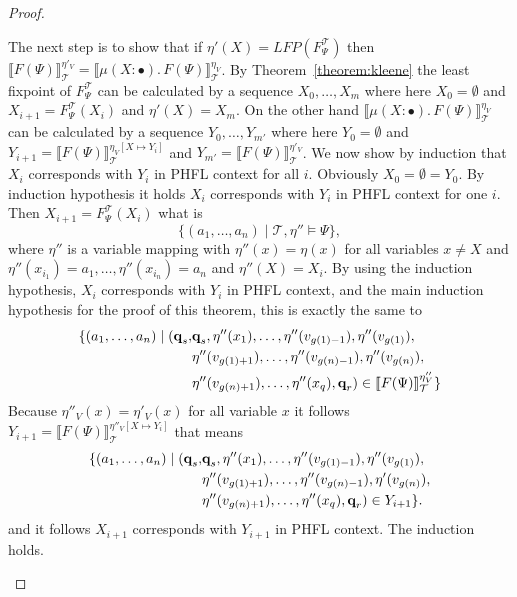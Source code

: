\begin{proof}
\begin{compactitem}
        The next step is to show that if $\eta'(X) = LFP(F^\mathcal{T}_\Psi)$ then $\llbracket F(\Psi) \rrbracket^{\eta'_V}_\mathcal{T} = \llbracket \mu (X \colon \bullet).\,F(\Psi)\rrbracket_\mathcal{T}^{\eta_V}$. By 
        Theorem~\ref{theorem:kleene} the least fixpoint of $F^\mathcal{T}_\Psi$ can be calculated by a sequence $X_0, \dots, X_m$ where here $X_0 = \emptyset$ and $X_{i+1} 
        = F_\Psi^\mathcal{T}(X_i)$ and $\eta'(X) = X_m$. On the other hand $\llbracket \mu (X \colon \bullet).\,F(\Psi)\rrbracket_\mathcal{T}^{\eta_V}$ can be calculated by a sequence 
         $Y_0, \dots, Y_{m'}$ where here $Y_0 = \emptyset$ and $Y_{i+1} = \llbracket F(\Psi)\rrbracket_\mathcal{T}^{\eta_V[X \mapsto Y_i]}$ and $Y_{m'} = \llbracket F(\Psi)\rrbracket_\mathcal{T}^{\eta'_V}$. We now show by induction that $X_i$ corresponds with $Y_i$ in PHFL context for all $i$. Obviously $X_0 = \emptyset = Y_0$. By induction hypothesis it holds $X_i$ corresponds with $Y_i$ in PHFL context for 
         one $i$. Then $X_{i+1} = F_\Psi^\mathcal{T}(X_i)$ what is
         \[\{(a_1, \dots, a_n) \mid \mathcal{T}, \eta'' \models \Psi\},\] 
         where $\eta''$ is a variable mapping with $\eta''(x) = \eta(x)$ for all variables $x \neq X$ and $\eta''(x_{i_1}) = a_1, \dots,  \eta''(x_{i_n}) = a_n$ and $\eta''(X) = X_i$. 
         By using the induction hypothesis, $X_i$ corresponds with $Y_i$ in PHFL context, and the main induction hypothesis for the proof of this theorem, this is exactly the same to
                 \begin{align*}
                 \{(a_1, \dots, a_n) \mid 
        (\emph{q}_s, &\emph{q}_s, \eta''(x_1), \dots, \eta''(v_{g(1)-1}), \eta''(v_{g(1)}),\\& \eta''(v_{g(1)+1}), \dots, \eta''(v_{g(n)-1}), \eta''(v_{g(n)}), \\&\eta''(v_{g(n)+1}), \dots, \eta''
            (x_q), \emph{q}_r) \in \llbracket
        F(\Psi) \rrbracket^{\eta''_V}_\mathcal{T}\}
        \end{align*}
		Because $\eta''_V(x) = \eta'_V(x)$ for all variable $x$ it follows $Y_{i+1} = \llbracket F(\Psi)\rrbracket_\mathcal{T}^{\eta''_V[X \mapsto Y_i]}$ that means        
        \begin{align*}
                 \{(a_1, \dots, a_n) \mid 
        (\emph{q}_s, &\emph{q}_s, \eta''(x_1), \dots, \eta''(v_{g(1)-1}), \eta''(v_{g(1)}),\\& \eta''(v_{g(1)+1}), \dots, \eta''(v_{g(n)-1}), \eta'(v_{g(n)}), \\&\eta''(v_{g(n)+1}), \dots, \eta''
            (x_q), \emph{q}_r) \in Y_{i+1}\}.
        \end{align*}
         and it follows $X_{i+1}$ corresponds with $Y_{i+1}$ in PHFL context. The induction holds.
        

\end{compactitem}
\end{proof}
